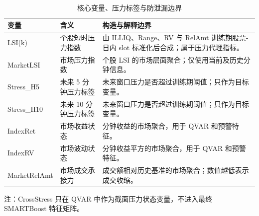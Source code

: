 \begin{table}[tbp]
\centering
\caption{核心变量、压力标签与防泄漏边界}
\label{tab:variables}
\small
\begin{threeparttable}
\begin{tabularx}{\textwidth}{p{}p{}Y}
\toprule
变量 & 含义 & 构造与解释边界 \\
\midrule
LSI(k) & 个股短时压力指数 & 由 ILLIQ、Range、RV 与 RelAmt 训练期股票-日内 slot 标准化后合成；属于压力代理指标。 \\
MarketLSI & 市场压力指数 & 个股 LSI 的市场层面聚合；仅使用当前及历史分钟信息。 \\
Stress\_H5 & 未来 5 分钟压力标签 & 未来窗口压力是否超过训练期阈值；只作为目标变量。 \\
Stress\_H10 & 未来 10 分钟压力标签 & 未来窗口压力是否超过训练期阈值；只作为目标变量。 \\
IndexRet & 市场收益状态 & 分钟收益的市场聚合，用于 QVAR 和预警特征。 \\
IndexRV & 市场波动状态 & 分钟收益平方的市场聚合，用于 QVAR 和预警特征。 \\
MarketRelAmt & 市场成交承接力 & 成交额相对历史基准的市场聚合；数值越低表示成交收缩。 \\
\bottomrule
\end{tabularx}
\begin{tablenotes}[flushleft]
\footnotesize
\item 注：CrossStress 只在 QVAR 中作为截面压力状态变量，不进入最终 SMARTBoost 特征矩阵。
\end{tablenotes}
\end{threeparttable}
\end{table}
